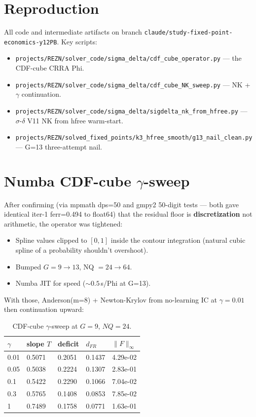 \documentclass[11pt]{article}
\begin{document}
\section*{Reproduction}

All code and intermediate artifacts on branch
\texttt{claude/study-fixed-point-economics-y12PB}. Key scripts:
\begin{itemize}
\item \texttt{projects/REZN/solver\_code/sigma\_delta/cdf\_cube\_operator.py}
--- the CDF-cube CRRA Phi.
\item \texttt{projects/REZN/solver\_code/sigma\_delta/cdf\_cube\_NK\_sweep.py}
--- NK + $\gamma$ continuation.
\item \texttt{projects/REZN/solver\_code/sigma\_delta/sigdelta\_nk\_from\_hfree.py}
--- $\sigma$-$\delta$ V11 NK from hfree warm-start.
\item \texttt{projects/REZN/solved\_fixed\_points/k3\_hfree\_smooth/g13\_nail\_clean.py}
--- G=13 three-attempt nail.
\end{itemize}


\section{Numba CDF-cube $\gamma$-sweep}
\label{sec:nb-sweep}

After confirming (via mpmath dps=50 and gmpy2 50-digit tests --- both gave
identical iter-1 ferr=0.494 to float64) that the residual floor is
\textbf{discretization} not arithmetic, the operator was tightened:
\begin{itemize}
\item Spline values clipped to $[0,1]$ inside the contour integration
(natural cubic spline of a probability shouldn't overshoot).
\item Bumped $G=9\to 13$, NQ $=24\to 64$.
\item Numba JIT for speed ($\sim 0.5$\,s/Phi at G=13).
\end{itemize}

With those, Anderson(m=8) + Newton-Krylov from no-learning IC at $\gamma=0.01$
then continuation upward:

\begin{table}[H]
\centering
\begin{tabular}{lllll}
\toprule
$\gamma$ & slope $T$ & deficit & $d_{FR}$ & $\|F\|_\infty$ \\
\midrule
0.01 & 0.5071 & 0.2051 & 0.1437 & 4.29e-02 \\
0.05 & 0.5038 & 0.2224 & 0.1307 & 2.83e-01 \\
0.1 & 0.5422 & 0.2290 & 0.1066 & 7.04e-02 \\
0.3 & 0.5765 & 0.1408 & 0.0853 & 7.85e-02 \\
1 & 0.7489 & 0.1758 & 0.0771 & 1.63e-01 \\
\bottomrule
\end{tabular}
\caption{CDF-cube $\gamma$-sweep at $G=9$, $NQ=24$.}
\end{table}
\end{document}
